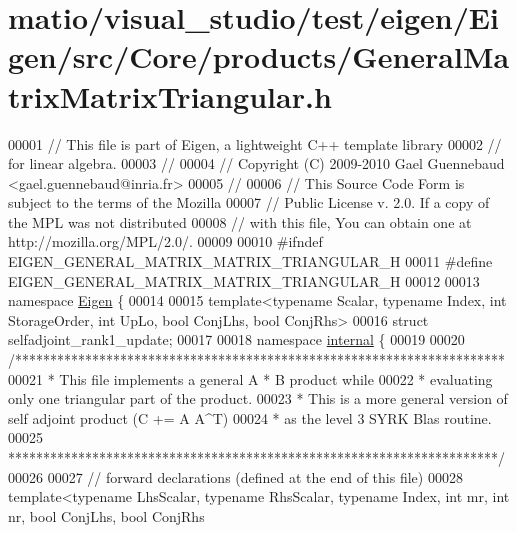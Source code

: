 \hypertarget{matio_2visual__studio_2test_2eigen_2_eigen_2src_2_core_2products_2_general_matrix_matrix_triangular_8h_source}{}\section{matio/visual\+\_\+studio/test/eigen/\+Eigen/src/\+Core/products/\+General\+Matrix\+Matrix\+Triangular.h}
\label{matio_2visual__studio_2test_2eigen_2_eigen_2src_2_core_2products_2_general_matrix_matrix_triangular_8h_source}

\begin{DoxyCode}
00001 \textcolor{comment}{// This file is part of Eigen, a lightweight C++ template library}
00002 \textcolor{comment}{// for linear algebra.}
00003 \textcolor{comment}{//}
00004 \textcolor{comment}{// Copyright (C) 2009-2010 Gael Guennebaud <gael.guennebaud@inria.fr>}
00005 \textcolor{comment}{//}
00006 \textcolor{comment}{// This Source Code Form is subject to the terms of the Mozilla}
00007 \textcolor{comment}{// Public License v. 2.0. If a copy of the MPL was not distributed}
00008 \textcolor{comment}{// with this file, You can obtain one at http://mozilla.org/MPL/2.0/.}
00009 
00010 \textcolor{preprocessor}{#ifndef EIGEN\_GENERAL\_MATRIX\_MATRIX\_TRIANGULAR\_H}
00011 \textcolor{preprocessor}{#define EIGEN\_GENERAL\_MATRIX\_MATRIX\_TRIANGULAR\_H}
00012 
00013 \textcolor{keyword}{namespace }\hyperlink{namespace_eigen}{Eigen} \{ 
00014 
00015 \textcolor{keyword}{template}<\textcolor{keyword}{typename} Scalar, \textcolor{keyword}{typename} Index, \textcolor{keywordtype}{int} StorageOrder, \textcolor{keywordtype}{int} UpLo, \textcolor{keywordtype}{bool} ConjLhs, \textcolor{keywordtype}{bool} ConjRhs>
00016 \textcolor{keyword}{struct }selfadjoint\_rank1\_update;
00017 
00018 \textcolor{keyword}{namespace }\hyperlink{namespaceinternal}{internal} \{
00019 
00020 \textcolor{comment}{/**********************************************************************}
00021 \textcolor{comment}{* This file implements a general A * B product while}
00022 \textcolor{comment}{* evaluating only one triangular part of the product.}
00023 \textcolor{comment}{* This is a more general version of self adjoint product (C += A A^T)}
00024 \textcolor{comment}{* as the level 3 SYRK Blas routine.}
00025 \textcolor{comment}{**********************************************************************/}
00026 
00027 \textcolor{comment}{// forward declarations (defined at the end of this file)}
00028 \textcolor{keyword}{template}<\textcolor{keyword}{typename} LhsScalar, \textcolor{keyword}{typename} RhsScalar, \textcolor{keyword}{typename} Index, \textcolor{keywordtype}{int} mr, \textcolor{keywordtype}{int} nr, \textcolor{keywordtype}{bool} ConjLhs, \textcolor{keywordtype}{bool} ConjRhs

\end{DoxyCode}
